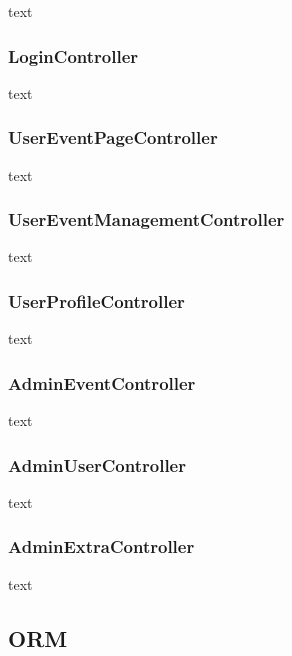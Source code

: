 \documentclass[11pt]{article}
\begin{document}
            text

            \subsubsection{LoginController} \label{subsubsec:login-controller}

                text

            \subsubsection{UserEventPageController} \label{subsubsec:user-event-page-controller}

                text

            \subsubsection{UserEventManagementController} \label{subsubsec:user-event-management-controller}

                text

            \subsubsection{UserProfileController} \label{subsubsec:user-profile-controller}

                text

            \subsubsection{AdminEventController} \label{subsubsec:admin-event-controller}

                text

            \subsubsection{AdminUserController} \label{subsubsec:admin-user-controller}

                text

            \subsubsection{AdminExtraController} \label{subsubsec:admin-extra-controller}

                text

        \subsection{ORM} \label{subsec:orm}
\end{document}
